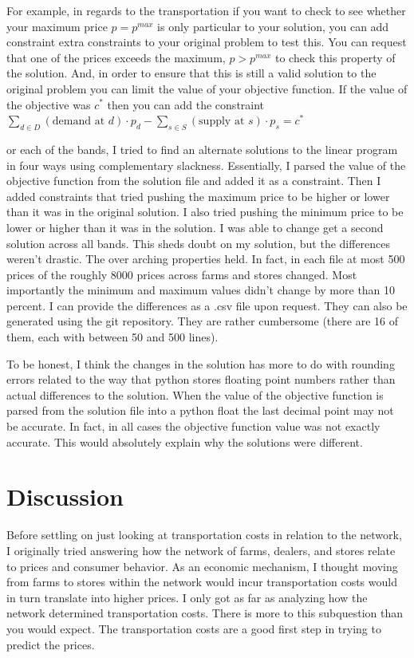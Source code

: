 \documentclass{report}
\begin{document}
For example, in regards to the transportation if you want to check to see whether your maximum price $p = p^{max}$ is only particular to your solution, you can add constraint extra constraints to your original problem to test this. You can request that one of the prices exceeds the maximum, $p > p^{max}$ to check this property of the solution. And, in order to ensure that this is still a valid solution to the original problem you can limit the value of your objective function. If the value of the objective was $c^*$ then you can add the constraint  $ \sum_{d \in D}  (\text{demand at } d) \cdot p_{d} -   \sum_{s \in S}  (\text{supply at } s) \cdot p_{s} = c^*$

or each of the bands, I tried to find an alternate solutions to the linear program in four ways using complementary slackness. Essentially, I parsed the value of the objective function from the solution file and added it as a constraint. Then I added constraints that tried pushing the maximum price to be higher or lower than it was in the original solution. I also tried pushing the minimum price to be lower or higher than it was in the solution. I was able to change get a second solution across all bands. This sheds doubt on my solution, but the differences weren't drastic. The over arching properties held. In fact, in each file at most 500 prices of the roughly 8000 prices across farms and stores changed. Most importantly the minimum and maximum values didn't change by more than 10 percent. I can provide the differences as a .csv file upon request. They can also be generated using the git repository. They are rather cumbersome (there are 16 of them, each with between 50 and 500 lines).

To be honest, I think the changes in the solution has more to do with rounding errors related to the way that python stores floating point numbers rather than actual differences to the solution. When the value of the objective function is parsed from the solution file into a python float the last decimal point may not be accurate. In fact, in all cases the objective function value was not exactly accurate. This would absolutely explain why the solutions were different.

\chapter{Discussion}

Before settling on just looking at transportation costs in relation to the network, I originally tried answering how the network of farms, dealers, and stores relate to prices and consumer behavior. As an economic mechanism, I thought moving from farms to stores within the network would incur transportation costs would in turn translate into higher prices. I only got as far as analyzing how the network determined transportation costs. There is more to this subquestion than you would expect. The transportation costs are a good first step in trying to predict the prices.
\end{document}
